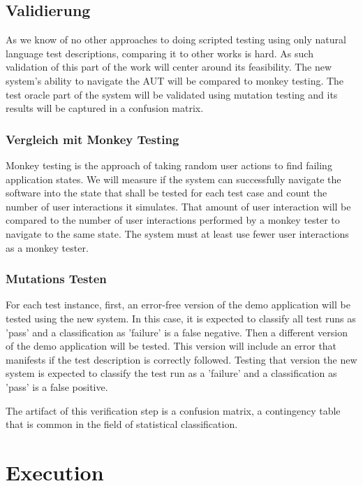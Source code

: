 \section{Validierung}

As we know of no other approaches to doing scripted testing using only natural language test descriptions, comparing it to other works is hard.
As such validation of this part of the work will center around its feasibility.
The new system's ability to navigate the AUT will be compared to monkey testing.
The test oracle part of the system will be validated using mutation testing and its results will be captured in a confusion matrix.

\subsection{Vergleich mit Monkey Testing}

Monkey testing is the approach of taking random user actions to find failing application states.
We will measure if the system can successfully navigate the software into the state that shall be tested for each test case and count the number of user interactions it simulates.
That amount of user interaction will be compared to the number of user interactions performed by a monkey tester to navigate to the same state.
The system must at least use fewer user interactions as a monkey tester.

\subsection{Mutations Testen}

For each test instance, first, an error-free version of the demo application will be tested using the new system.
In this case, it is expected to classify all test runs as 'pass' and a classification as 'failure' is a false negative.
Then a different version of the demo application will be tested.
This version will include an error that manifests if the test description is correctly followed.
Testing that version the new system is expected to classify the test run as a 'failure' and a classification as 'pass' is a false positive.

The artifact of this verification step is a confusion matrix, a contingency table that is common in the field of statistical classification.

\iffalse
\chapter{Execution}

